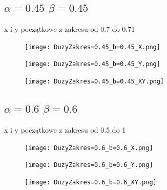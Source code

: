 \documentclass{article}
\begin{document}
    \newpage
    \subsection{$\alpha=0.45$ $\beta=0.45$}
    x i y początkowe z zakresu od 0.7 do 0.71
            \begin{figure}[ht]
        \centering
        \begin{minipage}{.5\textwidth}
            \centering
            \texttt{[image: DuzyZakres=0.45\_b=0.45\_X.png]}
            \label{fig:test11}
        \end{minipage}%
        \begin{minipage}{.5\textwidth}
            \centering
            \texttt{[image: DuzyZakres=0.45\_b=0.45\_Y.png]}
            \label{fig:test12}
        \end{minipage}
        \centering
        \begin{minipage}{.5\textwidth}
            \centering
            \texttt{[image: DuzyZakres=0.45\_b=0.45\_XY.png]}
            \label{fig:test13}
        \end{minipage}%
    \end{figure}

    \newpage
    \subsection{$\alpha=0.6$ $\beta=0.6$}
    x i y początkowe z zakresu od 0.5 do 1
            \begin{figure}[ht]
        \centering
        \begin{minipage}{.5\textwidth}
            \centering
            \texttt{[image: DuzyZakres=0.6\_b=0.6\_X.png]}
            \label{fig:test11}
        \end{minipage}%
        \begin{minipage}{.5\textwidth}
            \centering
            \texttt{[image: DuzyZakres=0.6\_b=0.6\_Y.png]}
            \label{fig:test12}
        \end{minipage}
        \centering
        \begin{minipage}{.5\textwidth}
            \centering
            \texttt{[image: DuzyZakres=0.6\_b=0.6\_XY.png]}
            \label{fig:test13}
        \end{minipage}%
    \end{figure}
\end{document}
